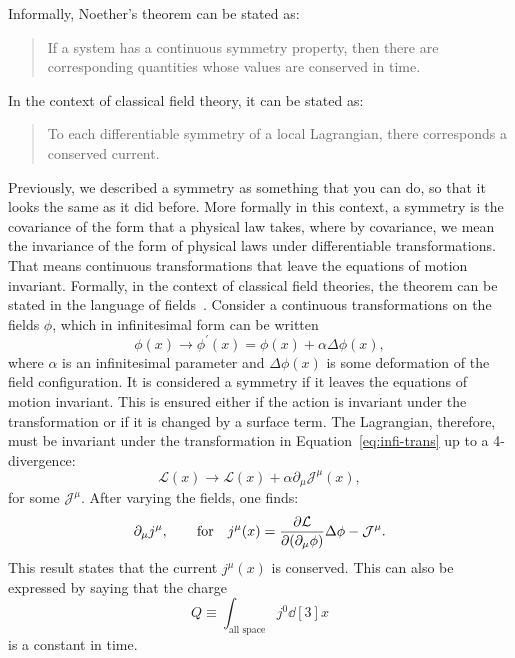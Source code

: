 Informally, Noether's theorem can be stated as:
\begin{quote}
If a system has a continuous symmetry property, then there are corresponding quantities whose values are conserved in time.
\end{quote}
In the context of classical field theory, it can be stated as:
\begin{quote}
To each differentiable symmetry of a local Lagrangian, there corresponds a conserved current.
\end{quote}
Previously, we described a symmetry as something that you can do, so that it looks the same as it did before. More formally in this context, a symmetry is the covariance of the form that a physical law takes, where by covariance, we mean the invariance of the form of physical laws under differentiable transformations. That means continuous transformations that leave the equations of motion invariant. Formally, in the context of classical field theories, the theorem can be stated in the language of fields~\cite{Peskin2019-bt}. Consider a continuous transformations on the fields $\phi$, which in infinitesimal form can be written
\begin{equation}
\phi(x)\rightarrow\phi^\prime(x)=\phi(x)+\alpha\Delta\phi(x),
\label{eq:infi-trans}
\end{equation}  
where $\alpha$ is an infinitesimal parameter and $\Delta\phi(x)$ is some deformation of the field configuration. It is considered a symmetry if it leaves the equations of motion invariant. This is ensured either if the action is invariant under the transformation or if it is changed by a surface term. The Lagrangian, therefore, must be invariant under  the transformation in Equation~\ref{eq:infi-trans} up to a 4-divergence:
\begin{equation}
\mathcal{L}(x)\rightarrow\mathcal{L}(x)+\alpha\partial_{\mu}\mathcal{J}^{\mu}(x),
\end{equation}
for some $\mathcal{J}^{\mu}$. After varying the fields, one finds:
\begin{equation}
\partial_{\mu}j^{\mu},\qquad \textrm{for} \quad j^{\mu}(x)=\pdv{\mathcal{L}}{\qty(\partial_{\mu}\phi)}\Delta\phi-\mathcal{J}^{\mu}.
\end{equation}
This result states that the current $j^{\mu}(x)$ is conserved. This can also be expressed by saying that the charge
\begin{equation}
Q\equiv\int_{\textrm{all space}}j^0\dd[3]{x}
\end{equation}
is a constant in time.

